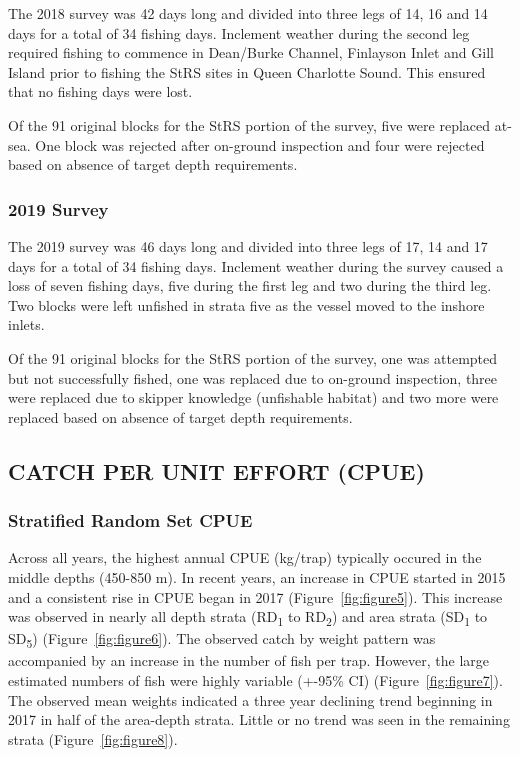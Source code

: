 \documentclass[12pt]{article}\usepackage[]{graphicx}\usepackage[]{color}
\begin{document}
The 2018 survey was 42 days long and divided into three legs of 14, 16 and 14 days for a total of 34 fishing days. Inclement weather during the second leg required fishing to commence in Dean/Burke Channel, Finlayson Inlet and Gill Island prior to fishing the StRS sites in Queen Charlotte Sound. This ensured that no fishing days were lost.

Of the 91 original blocks for the StRS portion of the survey, five were replaced at-sea. One block was rejected after on-ground inspection and four were rejected based on absence of target depth requirements.

\hypertarget{survey-1}{%
\subsubsection{2019 Survey}\label{survey-1}}

The 2019 survey was 46 days long and divided into three legs of 17, 14 and 17 days for a total of 34 fishing days. Inclement weather during the survey caused a loss of seven fishing days, five during the first leg and two during the third leg. Two blocks were left unfished in strata five as the vessel moved to the inshore inlets.

Of the 91 original blocks for the StRS portion of the survey, one was attempted but not successfully fished, one was replaced due to on-ground inspection, three were replaced due to skipper knowledge (unfishable habitat) and two more were replaced based on absence of target depth requirements.

\hypertarget{catch-per-unit-effort-cpue}{%
\subsection{CATCH PER UNIT EFFORT (CPUE)}\label{catch-per-unit-effort-cpue}}

\hypertarget{stratified-random-set-cpue}{%
\subsubsection{Stratified Random Set CPUE}\label{stratified-random-set-cpue}}

Across all years, the highest annual CPUE (kg/trap) typically occured in the middle depths (450-850 m). In recent years, an increase in CPUE started in 2015 and a consistent rise in CPUE began in 2017 (Figure~\ref{fig:figure5}). This increase was observed in nearly all depth strata (RD\textsubscript{1} to RD\textsubscript{2}) and area strata (SD\textsubscript{1} to SD\textsubscript{5}) (Figure~\ref{fig:figure6}). The observed catch by weight pattern was accompanied by an increase in the number of fish per trap. However, the large estimated numbers of fish were highly variable (+-95\% CI) (Figure~\ref{fig:figure7}). The observed mean weights indicated a three year declining trend beginning in 2017 in half of the area-depth strata. Little or no trend was seen in the remaining strata (Figure~\ref{fig:figure8}).
\end{document}
